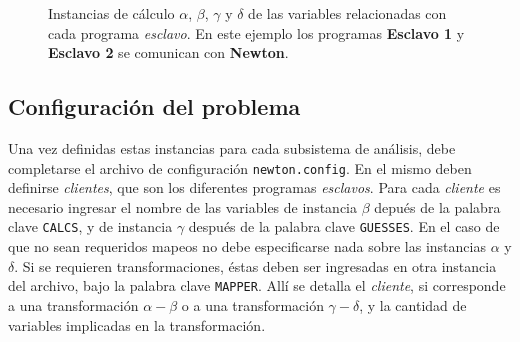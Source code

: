 \begin{figure}[h]
\caption[Instancias de cálculo de las variables relacionadas con cada programa \textit{esclavo}]
{Instancias de cálculo $\alpha$, $\beta$, $\gamma$ y $\delta$ de las variables relacionadas con cada programa \textit{esclavo}.
En este ejemplo los programas \textbf{Esclavo 1} y \textbf{Esclavo 2} se comunican con \textbf{Newton}.}
\label{fig:abgd}
\end{figure}

\subsection*{Configuración del problema}
\label{ap1:abgd}

Una vez definidas estas instancias para cada subsistema de análisis, debe completarse el archivo de configuración \texttt{newton.config}.
En el mismo deben definirse \textit{clientes}, que son los diferentes programas \textit{esclavos}.
Para cada \textit{cliente} es necesario ingresar el nombre de las variables de instancia $\beta$ depués de la palabra clave \texttt{CALCS},
y de instancia $\gamma$ después de la palabra clave \texttt{GUESSES}.
En el caso de que no sean requeridos mapeos no debe especificarse nada sobre las instancias $\alpha$ y $\delta$.
Si se requieren transformaciones, éstas deben ser ingresadas en otra instancia del archivo, bajo la palabra clave \texttt{MAPPER}.
Allí se detalla el \textit{cliente}, si corresponde a una transformación $\alpha-\beta$ o a una transformación $\gamma-\delta$, y la cantidad de variables implicadas en la transformación.

